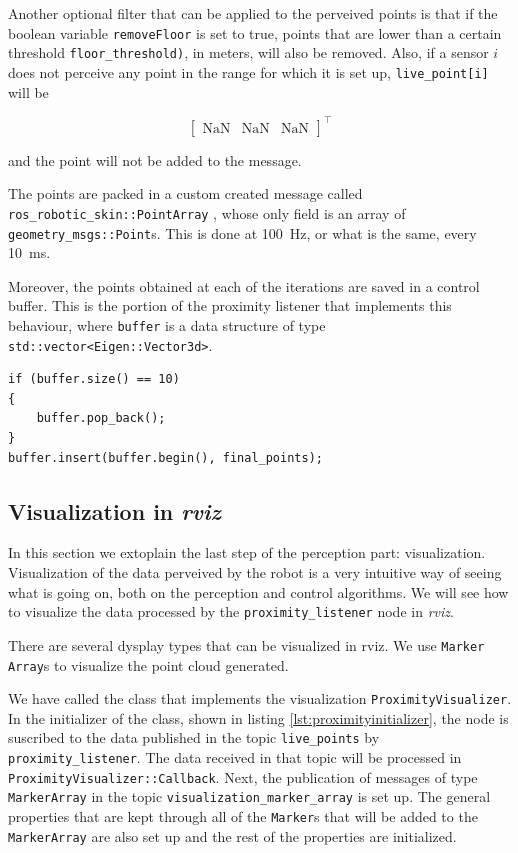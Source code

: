 Another optional filter that can be applied to the perveived points is that if the boolean variable \lstinline{removeFloor} is set to true, points that are lower than a certain threshold \lstinline{floor_threshold)}, in meters, will also be removed. Also, if a sensor $i$ does not perceive any point in the range for which it is set up, \lstinline{live_point[i]} will be

$$
\begin{bmatrix}
\text{NaN} & \text{NaN} & \text{NaN}
\end{bmatrix}
^{\intercal}
$$

and the point will not be added to the message.

The points are packed in a custom created message called \lstinline{ros_robotic_skin::PointArray} , whose only field is an array of \lstinline{geometry_msgs::Point}s. This is done at \SI{100}{\hertz}, or what is the same, every \SI{10}{\milli \second}.

Moreover, the points obtained at each of the iterations are saved in a control buffer. This is the portion of the proximity listener that implements this behaviour, where \lstinline{buffer} is a data structure of type \lstinline{std::vector<Eigen::Vector3d>}.

\begin{lstlisting}[caption={Initializer of the ProximityVisualizer class},captionpos=b,label={lst:proximityinitializer}]
if (buffer.size() == 10)
{
    buffer.pop_back();
}
buffer.insert(buffer.begin(), final_points);
\end{lstlisting}

\subsection{Visualization in \textit{rviz}}
\label{ss:visualization}

In this section we extoplain the last step of the perception part: visualization. Visualization of the data perveived by the robot is a very intuitive way of seeing what is going on, both on the perception and control algorithms. We will see how to visualize the data processed by the \lstinline{proximity_listener} node in \textit{rviz}.

There are several dysplay types that can be visualized in rviz. We use \lstinline{Marker Array}s \cite{rvizmarker} to visualize the point cloud generated.

We have called the class that implements the visualization \lstinline{ProximityVisualizer}. In the initializer of the class, shown in listing \ref{lst:proximityinitializer}, the node is suscribed  to the data published in the topic \lstinline{live_points} by \lstinline{proximity_listener}. The data received in that topic will be processed in \lstinline{ProximityVisualizer::Callback}. Next, the publication of messages of type \lstinline{MarkerArray} in the topic \lstinline{visualization_marker_array} is set up. The general properties that are kept through all of the \lstinline{Marker}s that will be added to the \lstinline{MarkerArray} are also set up and the rest of the properties are initialized.

